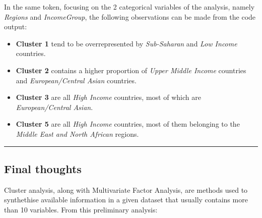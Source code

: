 \documentclass[]{article}
\begin{document}
In the same token, focusing on the 2 categorical variables of the
analysis, namely \emph{Regions} and \emph{IncomeGroup}, the following
observations can be made from the code output:

\begin{itemize}
\item
  \textbf{Cluster 1} tend to be overrepresented by \emph{Sub-Saharan}
  and \emph{Low Income} countries.
\item
  \textbf{Cluster 2} contains a higher proportion of \emph{Upper Middle
  Income} countries and \emph{European/Central Asian} countries.
\item
  \textbf{Cluster 3} are all \emph{High Income} countries, most of which
  are \emph{European/Central Asian}.
\item
  \textbf{Cluster 5} are all \emph{High Income} countries, most of them
  belonging to the \emph{Middle East and North African} regions.
\end{itemize}

\begin{center}\rule{0.5\linewidth}{\linethickness}\end{center}

\subsection{Final thoughts}\label{final-thoughts}

Cluster analysis, along with Multivariate Factor Analysis, are methods
used to synthethise available information in a given dataset that
usually contains more than 10 variables. From this preliminary analysis:
\end{document}
